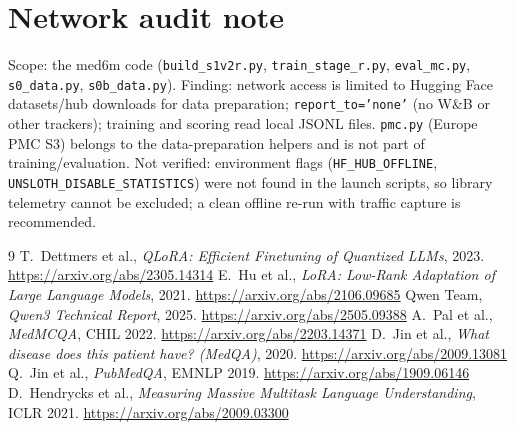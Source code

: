 \documentclass[11pt,a4paper]{article}
\begin{document}
\section{Network audit note}
Scope: the med6m code (\texttt{build\_s1v2r.py}, \texttt{train\_stage\_r.py}, \texttt{eval\_mc.py}, \texttt{s0\_data.py}, \texttt{s0b\_data.py}). Finding: network access is limited to Hugging Face datasets/hub downloads for data preparation; \texttt{report\_to='none'} (no W\&B or other trackers); training and scoring read local JSONL files. \texttt{pmc.py} (Europe PMC S3) belongs to the data-preparation helpers and is not part of training/evaluation. Not verified: environment flags (\texttt{HF\_HUB\_OFFLINE}, \texttt{UNSLOTH\_DISABLE\_STATISTICS}) were not found in the launch scripts, so library telemetry cannot be excluded; a clean offline re-run with traffic capture is recommended.
\begin{thebibliography}{9}
 T.~Dettmers et al., \emph{QLoRA: Efficient Finetuning of Quantized LLMs}, 2023. \url{https://arxiv.org/abs/2305.14314}
 E.~Hu et al., \emph{LoRA: Low-Rank Adaptation of Large Language Models}, 2021. \url{https://arxiv.org/abs/2106.09685}
 Qwen Team, \emph{Qwen3 Technical Report}, 2025. \url{https://arxiv.org/abs/2505.09388}
 A.~Pal et al., \emph{MedMCQA}, CHIL 2022. \url{https://arxiv.org/abs/2203.14371}
 D.~Jin et al., \emph{What disease does this patient have? (MedQA)}, 2020. \url{https://arxiv.org/abs/2009.13081}
 Q.~Jin et al., \emph{PubMedQA}, EMNLP 2019. \url{https://arxiv.org/abs/1909.06146}
 D.~Hendrycks et al., \emph{Measuring Massive Multitask Language Understanding}, ICLR 2021. \url{https://arxiv.org/abs/2009.03300}
\end{thebibliography}
\end{document}
